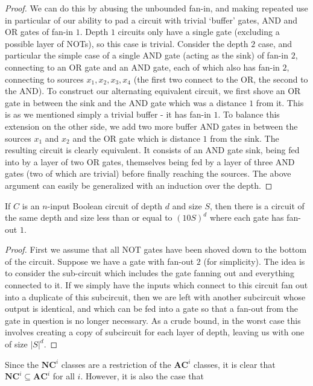 \begin{proof}
	We can do this by abusing the unbounded fan-in, and making repeated use in particular of our ability to pad a circuit with trivial `buffer' gates, AND and OR gates of fan-in $1$. Depth $1$ circuits only have a single gate (excluding a possible layer of NOTs), so this case is trivial. Consider the depth $2$ case, and particular the simple case of a single AND gate (acting as the sink) of fan-in $2$, connecting to an OR gate and an AND gate, each of which also has fan-in $2$, connecting to sources $x_1,x_2,x_3,x_4$ (the first two connect to the OR, the second to the AND). To construct our alternating equivalent circuit, we first shove an OR gate in between the sink and the AND gate which was a distance $1$ from it. This is as we mentioned simply a trivial buffer - it has fan-in $1$. To balance this extension on the other side, we add two more buffer AND gates in between the sources $x_1$ and $x_2$ and the OR gate which is distance $1$ from the sink. The resulting circuit is clearly equivalent. It consists of an AND gate sink, being fed into by a layer of two OR gates, themselves being fed by a layer of three AND gates (two of which are trivial) before finally reaching the sources. The above argument can easily be generalized with an induction over the depth. \par 
\end{proof}
\begin{fact}
	If $C$ is an $n$-input Boolean circuit of depth $d$ and size $S$, then there is a circuit of the same depth and size less than or equal to $(10S)^d$ where each gate has fan-out $1$. 
\end{fact}
\begin{proof}
	First we assume that all NOT gates have been shoved down to the bottom of the circuit. Suppose we have a gate with fan-out $2$ (for simplicity). The idea is to consider the sub-circuit which includes the gate fanning out and everything connected to it. If we simply have the inputs which connect to this circuit fan out into a duplicate of this subcircuit, then we are left with another subcircuit whose output is identical, and which can be fed into a gate so that a fan-out from the gate in question is no longer necessary. As a crude bound, in the worst case this involves creating a copy of subcircuit for each layer of depth, leaving us with one of size $|S|^d$.
\end{proof}
Since the $\bm{NC}^i$ classes are a restriction of the $\bm{AC}^i$ classes, it is clear that $\bm{NC}^i \subseteq \bm{AC}^i$ for all $i$. However, it is also the case that

